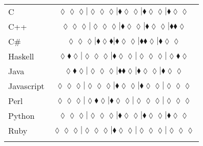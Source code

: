 \begin{table*}
{\begin{tabular}{l c}
C & $\scriptscriptstyle\lozenge\lozenge\lozenge|\lozenge\lozenge\lozenge|\blacklozenge\lozenge\lozenge|\blacklozenge\lozenge\lozenge|\blacklozenge\lozenge\lozenge$ \\
C++ & $\scriptscriptstyle\lozenge\lozenge\lozenge|\lozenge\lozenge\lozenge|\blacklozenge\lozenge\lozenge|\blacklozenge\lozenge\lozenge|\blacklozenge\blacklozenge\lozenge$ \\
C\# & $\scriptscriptstyle\lozenge\lozenge\lozenge|\blacklozenge\lozenge\blacklozenge|\blacklozenge\lozenge\lozenge|\blacklozenge\blacklozenge\lozenge|\blacklozenge\lozenge\lozenge$ \\
Haskell & $\scriptscriptstyle\lozenge\blacklozenge\lozenge|\lozenge\lozenge\lozenge|\blacklozenge\lozenge\lozenge|\lozenge\lozenge\lozenge|\lozenge\blacklozenge\lozenge$ \\
Java & $\scriptscriptstyle\lozenge\blacklozenge\lozenge|\lozenge\lozenge\lozenge|\blacklozenge\blacklozenge\lozenge|\blacklozenge\lozenge\lozenge|\blacklozenge\lozenge\lozenge$ \\
Javascript & $\scriptscriptstyle\lozenge\lozenge\lozenge|\lozenge\lozenge\lozenge|\blacklozenge\lozenge\lozenge|\blacklozenge\lozenge\lozenge|\lozenge\lozenge\lozenge$ \\
Perl & $\scriptscriptstyle\lozenge\lozenge\lozenge|\lozenge\blacklozenge\lozenge|\blacklozenge\lozenge\lozenge|\lozenge\lozenge\lozenge|\lozenge\lozenge\lozenge$ \\
Python & $\scriptscriptstyle\lozenge\lozenge\lozenge|\lozenge\lozenge\lozenge|\blacklozenge\lozenge\lozenge|\blacklozenge\lozenge\lozenge|\blacklozenge\lozenge\lozenge$ \\
Ruby & $\scriptscriptstyle\lozenge\lozenge\lozenge|\lozenge\lozenge\lozenge|\blacklozenge\lozenge\lozenge|\lozenge\lozenge\lozenge|\lozenge\lozenge\lozenge$ \\

\hline
& \\
\end{tabular}
} 
\end{table*}
